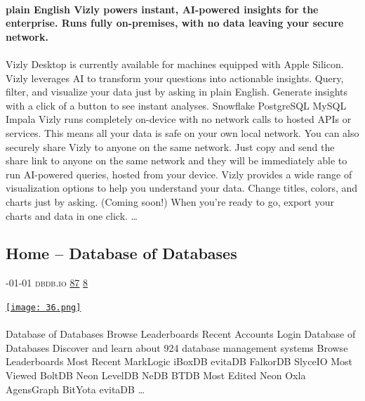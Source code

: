 \documentclass[10pt,a4paper]{article}
\begin{document}
\begin{multicols}{2}
\paragraph{}
\textbf{plain English
Vizly powers instant, AI-powered insights for the enterprise. Runs fully on-premises, with no data leaving your secure network.}
\paragraph{}

Vizly Desktop is currently available for machines equipped with Apple Silicon.
Vizly leverages AI to transform your questions into actionable insights.
Query, filter, and visualize your data just by asking in plain English.
Generate insights with a click of a button to see instant analyses.
Snowflake
PostgreSQL
MySQL
Impala
Vizly runs completely on-device with no network calls to hosted APIs or services. This means all your data is safe on your own local network.
You can also securely share Vizly to anyone on the same network. Just copy and send the share link to anyone on the same network and they will be immediately able to run AI-powered queries, hosted from your device.
Vizly provides a wide range of visualization options to help you understand your data.
Change titles, colors, and charts just by asking. (Coming soon!)
When you're ready to go, export your charts and data in one click.
\dots\par
\noindent\begin{minipage}{\linewidth}
\medskip
\subsection{Home – Database of Databases}
\textsc{\footnotesize
{\scriptsize\faCalendar}-01-01 
{\scriptsize\faGlobe}\space 
dbdb.io 
{\scriptsize\faThumbsOUp}\space 
\href{http://news.ycombinator.com/item?id=37314622\&utm\_term=comment}{87} 
{\scriptsize\faComments}\space 
\href{http://news.ycombinator.com/item?id=37314622\&utm\_term=comment}{8} 
}
\par\medskip\noindent
\href{https://dbdb.io/?utm\_source=hackernewsletter\&utm\_medium=email\&utm\_term=data}{
    \texttt{[image: 36.png]}
}
\end{minipage}
\paragraph{}
Database of Databases
Browse
Leaderboards
Recent
Accounts
Login
Database of Databases
Discover and learn about
924
database management systems
Browse
Leaderboards
Most Recent
MarkLogic
iBoxDB
evitaDB
FalkorDB
SlyceIO
Most Viewed
BoltDB
Neon
LevelDB
NeDB
BTDB
Most Edited
Neon
Oxla
AgensGraph
BitYota
evitaDB
\dots\par
\noindent\begin{minipage}{\linewidth}
\medskip

\end{minipage}
\end{multicols}
\end{document}
